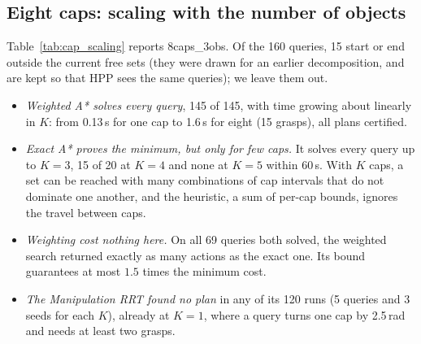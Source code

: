 \subsection{Eight caps: scaling with the number of objects}
\label{sec:results:scaling}
Table~\ref{tab:cap_scaling} reports \textsf{8caps\_3obs}. Of the 160
queries, 15 start or end outside the current free sets (they were drawn for
an earlier decomposition, and are kept so that HPP sees the same queries);
we leave them out.
\begin{itemize}
  \item \emph{Weighted A* solves every query}, 145 of 145, with time growing
    about linearly in $K$: from 0.13\,s for one cap to 1.6\,s for eight
    (15 grasps), all plans certified.
  \item \emph{Exact A* proves the minimum, but only for few caps.} It solves
    every query up to $K=3$, 15 of 20 at $K=4$ and none at $K=5$ within
    60\,s. With $K$ caps, a set can be reached with many combinations of cap
    intervals that do not dominate one another, and the heuristic, a sum of
    per-cap bounds, ignores the travel between caps.
  \item \emph{Weighting cost nothing here.} On all 69 queries both solved,
    the weighted search returned exactly as many actions as the exact one.
    Its bound guarantees at most $1.5$ times the minimum cost.
  \item \emph{The Manipulation RRT found no plan} in any of its 120 runs
    (5 queries and 3 seeds for each $K$), already at $K=1$, where a query
    turns one cap by 2.5\,rad and needs at least two grasps.
\end{itemize}

